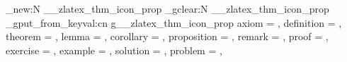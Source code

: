 

\RequirePackage[many]{tcolorbox}
\RequirePackage{adjustbox}
\RequirePackage{tikz}
\RequirePackage{etoolbox}
\usetikzlibrary{fadings, calc}
\RequirePackage{pifont}

\prop_new:N \g__zlatex_thm_icon_prop
\prop_gclear:N \g__zlatex_thm_icon_prop
\prop_gput_from_keyval:cn {g__zlatex_thm_icon_prop}
  {
    axiom       = ,
    definition  = , 
    theorem     = , 
    lemma       = ,
    corollary   = , 
    proposition = , 
    remark      = ,
    proof       = , 
    exercise    = ,
    example     = ,
    solution    = , 
    problem     = ,
  }

